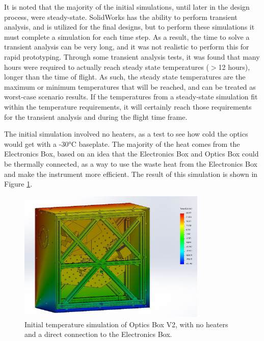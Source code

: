 It is noted that the majority of the initial simulations, until later in the design process, were steady-state. SolidWorks has the ability to perform transient analysis, and is utilized for the final designs, but to perform these simulations it must complete a simulation for each time step. As a result, the time to solve a transient analysis can be very long, and it was not realistic to perform this for rapid prototyping. Through some transient analysis tests, it was found that many hours were required to actually reach steady state temperatures ($>$12 hours), longer than the time of flight. As such, the steady state temperatures are the maximum or minimum temperatures that will be reached, and can be treated as worst-case scenario results. If the temperatures from a steady-state simulation fit within the temperature requirements, it will certainly reach those requirements for the transient analysis and during the flight time frame.

The initial simulation involved no heaters, as a test to see how cold the optics would get with a -30°C baseplate. The majority of the heat comes from the Electronics Box, based on an idea that the Electronics Box and Optics Box could be thermally connected, as a way to use the waste heat from the Electronics Box and make the instrument more efficient. The result of this simulation is shown in Figure \ref{fig:OB_V2_TA_1}. 

\begin{figure}
    \centering
    \includegraphics[width=0.8\textwidth]{chap3_images/LIFE_V2_images/Thermal_Analysis_25_deg_-30_deg.JPG}
    \caption{Initial temperature simulation of Optics Box V2, with no heaters and a direct connection to the Electronics Box.}
    \label{fig:OB_V2_TA_1}
\end{figure}

